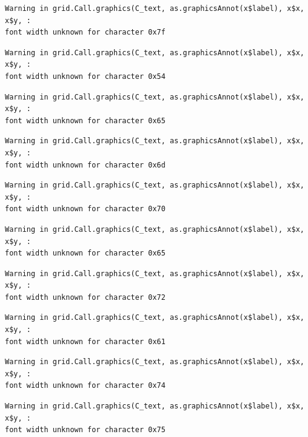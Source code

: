 \documentclass[
  letterpaper,
]{scrbook}
\begin{document}
\begin{verbatim}
Warning in grid.Call.graphics(C_text, as.graphicsAnnot(x$label), x$x, x$y, :
font width unknown for character 0x7f
\end{verbatim}

\begin{verbatim}
Warning in grid.Call.graphics(C_text, as.graphicsAnnot(x$label), x$x, x$y, :
font width unknown for character 0x54
\end{verbatim}

\begin{verbatim}
Warning in grid.Call.graphics(C_text, as.graphicsAnnot(x$label), x$x, x$y, :
font width unknown for character 0x65
\end{verbatim}

\begin{verbatim}
Warning in grid.Call.graphics(C_text, as.graphicsAnnot(x$label), x$x, x$y, :
font width unknown for character 0x6d
\end{verbatim}

\begin{verbatim}
Warning in grid.Call.graphics(C_text, as.graphicsAnnot(x$label), x$x, x$y, :
font width unknown for character 0x70
\end{verbatim}

\begin{verbatim}
Warning in grid.Call.graphics(C_text, as.graphicsAnnot(x$label), x$x, x$y, :
font width unknown for character 0x65
\end{verbatim}

\begin{verbatim}
Warning in grid.Call.graphics(C_text, as.graphicsAnnot(x$label), x$x, x$y, :
font width unknown for character 0x72
\end{verbatim}

\begin{verbatim}
Warning in grid.Call.graphics(C_text, as.graphicsAnnot(x$label), x$x, x$y, :
font width unknown for character 0x61
\end{verbatim}

\begin{verbatim}
Warning in grid.Call.graphics(C_text, as.graphicsAnnot(x$label), x$x, x$y, :
font width unknown for character 0x74
\end{verbatim}

\begin{verbatim}
Warning in grid.Call.graphics(C_text, as.graphicsAnnot(x$label), x$x, x$y, :
font width unknown for character 0x75
\end{verbatim}
\end{document}
